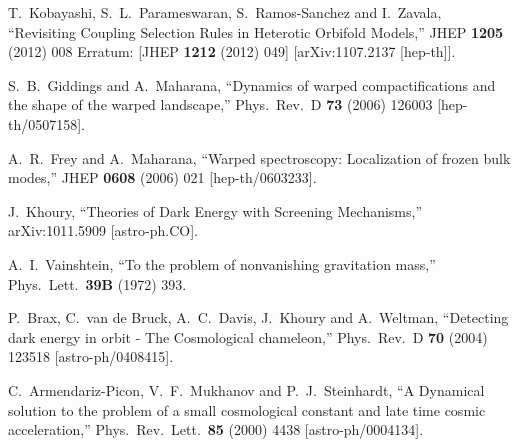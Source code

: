 \documentclass[11pt,a4paper]{article}
\begin{document}
\begin{thebibliography}{99}
  T.~Kobayashi, S.~L.~Parameswaran, S.~Ramos-Sanchez and I.~Zavala,
  ``Revisiting Coupling Selection Rules in Heterotic Orbifold Models,''
  JHEP {\bf 1205} (2012) 008
   Erratum: [JHEP {\bf 1212} (2012) 049]
  [arXiv:1107.2137 [hep-th]].

  S.~B.~Giddings and A.~Maharana,
  ``Dynamics of warped compactifications and the shape of the warped landscape,''
  Phys.\ Rev.\ D {\bf 73} (2006) 126003
  [hep-th/0507158].


  A.~R.~Frey and A.~Maharana,
  ``Warped spectroscopy: Localization of frozen bulk modes,''
  JHEP {\bf 0608} (2006) 021
  [hep-th/0603233].


  J.~Khoury,
  ``Theories of Dark Energy with Screening Mechanisms,''
  arXiv:1011.5909 [astro-ph.CO].


  A.~I.~Vainshtein,
  ``To the problem of nonvanishing gravitation mass,''
  Phys.\ Lett.\  {\bf 39B} (1972) 393.


  P.~Brax, C.~van de Bruck, A.~C.~Davis, J.~Khoury and A.~Weltman,
  ``Detecting dark energy in orbit - The Cosmological chameleon,''
  Phys.\ Rev.\ D {\bf 70} (2004) 123518
  [astro-ph/0408415].


  C.~Armendariz-Picon, V.~F.~Mukhanov and P.~J.~Steinhardt,
  ``A Dynamical solution to the problem of a small cosmological constant and late time cosmic acceleration,''
  Phys.\ Rev.\ Lett.\  {\bf 85} (2000) 4438
  [astro-ph/0004134].



\end{thebibliography}
\end{document}
